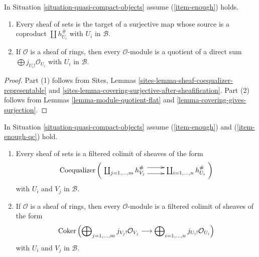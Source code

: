 \begin{lemma}
\label{lemma-module-quotient-direct-sum}
In Situation \ref{situation-quasi-compact-objects} assume
(\ref{item-enough}) holds.
\begin{enumerate}
\item Every sheaf of sets is the target of a surjective map
whose source is a coproduct $\coprod h_{U_i}^\#$ with $U_i$ in $\mathcal{B}$.
\item If $\mathcal{O}$ is a sheaf of rings, then every $\mathcal{O}$-module
is a quotient of a direct sum $\bigoplus\nolimits j_{U_i!}\mathcal{O}_{U_i}$
with $U_i$ in $\mathcal{B}$.
\end{enumerate}
\end{lemma}

\begin{proof}
Part (1) follows from Sites, Lemmas
\ref{sites-lemma-sheaf-coequalizer-representable} and
\ref{sites-lemma-covering-surjective-after-sheafification}.
Part (2) follows from Lemmas \ref{lemma-module-quotient-flat} and
\ref{lemma-covering-gives-surjection}.
\end{proof}

\begin{lemma}
\label{lemma-module-filtered-colimit-constructibles}
In Situation \ref{situation-quasi-compact-objects} assume
(\ref{item-enough}) and (\ref{item-enough-qc}) hold.
\begin{enumerate}
\item Every sheaf of sets is a filtered colimit of sheaves of the form
\begin{equation}
\label{equation-towards-constructible-sets}
\text{Coequalizer}\left(
\xymatrix{
\coprod\nolimits_{j = 1, \ldots, m} h_{V_j}^\#
\ar@<1ex>[r] \ar@<-1ex>[r] &
\coprod\nolimits_{i = 1, \ldots, n} h_{U_i}^\#
}
\right)
\end{equation}
with $U_i$ and $V_j$ in $\mathcal{B}$.
\item If $\mathcal{O}$ is a sheaf of rings, then every $\mathcal{O}$-module
is a filtered colimit of sheaves of the form
\begin{equation}
\label{equation-towards-constructible}
\mathop{\mathrm{Coker}}\left(
\bigoplus\nolimits_{j = 1, \ldots, m} j_{V_j!}\mathcal{O}_{V_j}
\longrightarrow
\bigoplus\nolimits_{i = 1, \ldots, n} j_{U_i!}\mathcal{O}_{U_i}
\right)
\end{equation}
with $U_i$ and $V_j$ in $\mathcal{B}$.
\end{enumerate}
\end{lemma}

